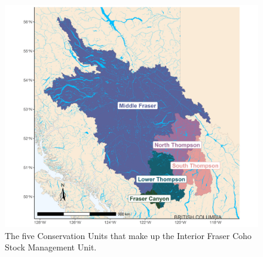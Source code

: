 \documentclass[
]{article}
\begin{document}
\begin{figure}

{\centering \includegraphics[width=0.6\linewidth]{figure/coho-map} 

}

\caption{The five Conservation Units that make up the Interior Fraser Coho Stock Management Unit.}\label{fig:coho-map}
\end{figure}
\end{document}
